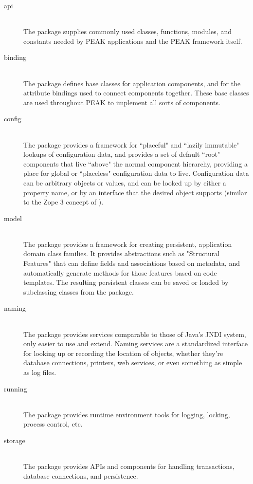 \begin{description}

\item[api] \hfill \\ 
The  package supplies commonly used classes, functions,
modules, and constants needed by PEAK applications and the PEAK framework
itself.

\item[binding] \hfill \\ 
The  package defines base classes for application
components, and for the attribute bindings used to connect components
together.  These base classes are used throughout PEAK to implement all
sorts of components.

\item[config] \hfill \\ 
The  package provides a framework for ``placeful" and
``lazily immutable" lookups of configuration data, and provides a set of 
default ``root" components that live ``above" the normal component 
hierarchy, providing a place for global or ``placeless" configuration data
to live.  Configuration data can be arbitrary objects or values, and can
be looked up by either a property name, or by an interface that the desired
object supports (similar to the Zope 3 concept of ).

\item[model] \hfill \\ 
The  package provides a framework for creating persistent,
application domain class families.  It provides abstractions such as
"Structural Features" that can define fields and associations based on
metadata, and automatically generate methods for those features based on code
templates.  The resulting persistent classes can be saved or loaded by
subclassing  classes from the  package.

\item[naming] \hfill \\ 
The  package provides services comparable to those of
Java's JNDI system, only easier to use and extend.  Naming services are
a standardized interface for looking up or recording the location of objects,
whether they're database connections, printers, web services, or even 
something as simple as log files.

\item[running] \hfill \\ 
The  package provides runtime environment tools for
logging, locking, process control, etc.

\item[storage] \hfill \\ 
The  package provides APIs and components for handling
transactions, database connections, and persistence.

\end{description}

